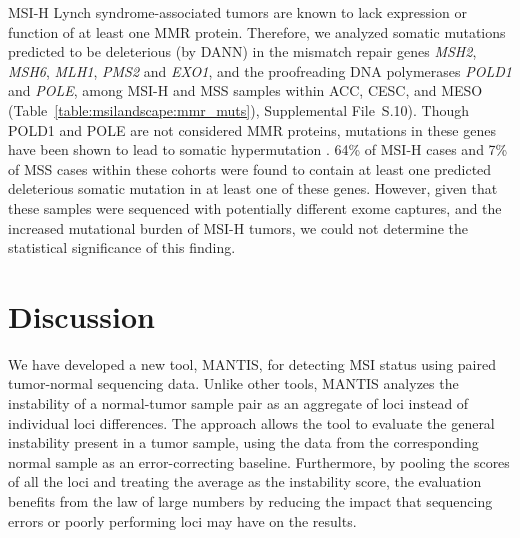 MSI-H Lynch syndrome-associated tumors are known to lack expression or function of at least one MMR protein. Therefore, we analyzed somatic mutations predicted to be deleterious (by DANN) in the mismatch repair genes \textit{MSH2}, \textit{MSH6}, \textit{MLH1}, \textit{PMS2} and \textit{EXO1}, and the proofreading DNA polymerases \textit{POLD1} and \textit{POLE}, among MSI-H and MSS samples within ACC, CESC, and MESO (Table~\ref{table:msilandscape:mmr_muts}), Supplemental File~S\thechapter{}.10). Though POLD1 and POLE are not considered MMR proteins, mutations in these genes have been shown to lead to somatic hypermutation \cite{tcgacoadread,johnson2015}. 64\% of MSI-H cases and 7\% of MSS cases within these cohorts were found to contain at least one predicted deleterious somatic mutation in at least one of these genes. However, given that these samples were sequenced with potentially different exome captures, and the increased mutational burden of MSI-H tumors, we could not determine the statistical significance of this finding.

\section{Discussion}
We have developed a new tool, MANTIS, for detecting MSI status using paired tumor-normal sequencing data. Unlike other tools, MANTIS analyzes the instability of a normal-tumor sample pair as an aggregate of loci instead of individual loci differences. The approach allows the tool to evaluate the general instability present in a tumor sample, using the data from the corresponding normal sample as an error-correcting baseline. Furthermore, by pooling the scores of all the loci and treating the average as the instability score, the evaluation benefits from the law of large numbers by reducing the impact that sequencing errors or poorly performing loci may have on the results.

